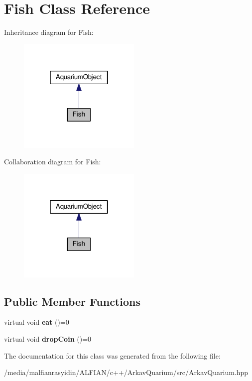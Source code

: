 \hypertarget{class_fish}{}\section{Fish Class Reference}
\label{class_fish}


Inheritance diagram for Fish\+:\nopagebreak
\begin{figure}[H]
\begin{center}
\leavevmode
\includegraphics[width=166pt]{class_fish__inherit__graph}
\end{center}
\end{figure}


Collaboration diagram for Fish\+:\nopagebreak
\begin{figure}[H]
\begin{center}
\leavevmode
\includegraphics[width=166pt]{class_fish__coll__graph}
\end{center}
\end{figure}
\subsection*{Public Member Functions}
\begin{DoxyCompactItemize}
\item 
\mbox{\label{class_fish_af209980bd39b8de9b4bb38b7ad4edd04}} 
virtual void {\bfseries eat} ()=0
\item 
\mbox{\label{class_fish_a899c7712639756297b9205e8bbcc2cf6}} 
virtual void {\bfseries drop\+Coin} ()=0
\end{DoxyCompactItemize}


The documentation for this class was generated from the following file\+:\begin{DoxyCompactItemize}
\item 
/media/malfianrasyidin/\+A\+L\+F\+I\+A\+N/c++/\+Arkav\+Quarium/src/Arkav\+Quarium.\+hpp\end{DoxyCompactItemize}
